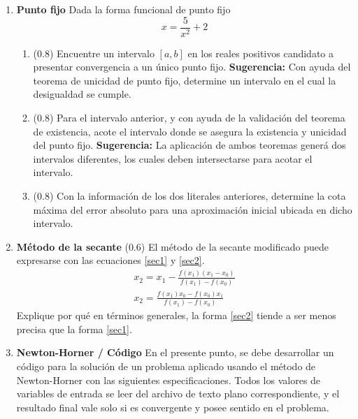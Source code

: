 \documentclass[12pt]{article}
\begin{document}
  \begin{enumerate}[leftmargin=*,widest=9]
    \item \textbf{Punto fijo} Dada la forma funcional de punto fijo
    \begin{equation*}
    x = \frac{5}{x^2} + 2
    \end{equation*}
    \begin{enumerate}[label=\alph*]
    \item (\(0.8\)) Encuentre un intervalo \([a, b]\) en los reales positivos candidato a presentar convergencia a un único punto fijo. \textbf{Sugerencia:} Con ayuda del teorema de unicidad de punto fijo, determine un intervalo en el cual la desigualdad se cumple.
   \vspace{7cm}
    \item (\(0.8\)) Para el intervalo anterior, y con ayuda de la validación del teorema de existencia, acote el intervalo donde se asegura la existencia y unicidad del punto fijo. \textbf{Sugerencia:} La aplicación de ambos teoremas generá dos intervalos diferentes, los cuales deben intersectarse para acotar el intervalo.
    \vspace{7cm}
   \item (\(0.8\)) Con la información de los dos literales anteriores, determine la cota máxima del error absoluto para una aproximación inicial ubicada en dicho intervalo.
   \vspace{5cm}
   \end{enumerate}
   \item \textbf{Método de la secante} (\(0.6\)) El método de la secante modificado puede expresarse con las ecuaciones \ref{sec1} y \ref{sec2}.
   \begin{eqnarray}
   x_2 = x_1 - \frac{f(x_1)(x_1 - x_0)}{f(x_1) - f(x_0)} \label{sec1}\\
   x_2 = \frac{f(x_1)x_0 - f(x_0)x_1}{f(x_1) - f(x_0)} \label{sec2}
   \end{eqnarray}
   Explique por qué en términos generales, la forma \ref{sec2} tiende a ser menos precisa que la forma \ref{sec1}.
   \vspace{5cm}
   \item \textbf{Newton-Horner / Código}
   En el presente punto, se debe desarrollar un código para la solución de un problema aplicado usando el método de Newton-Horner con las siguientes especificaciones. Todos los valores de variables de entrada se leer del archivo de texto plano correspondiente, y el resultado final vale solo si es convergente y posee sentido en el problema.

\end{enumerate}
\end{document}
